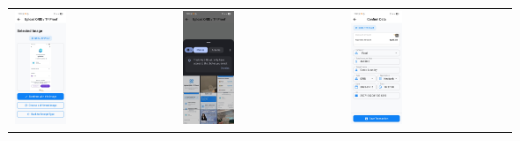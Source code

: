 \begin{tabular}{lll}
    \\
    \includegraphics[width=0.33\textwidth]{images/UI/qris-confirm.jpg} &
    \includegraphics[width=0.33\textwidth]{images/UI/qris-galery.jpg} &
    \includegraphics[width=0.33\textwidth]{images/UI/qris-mapping.jpg} \\
\end{tabular}

